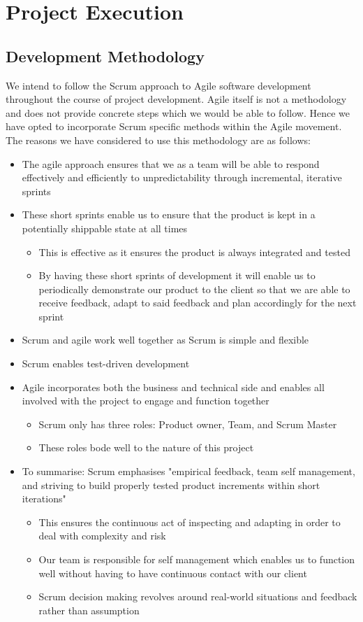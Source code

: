 \documentclass{article}
\begin{document}
\cleardoublepage
    
\section{Project Execution}
	\subsection{Development Methodology}
		We intend to follow the Scrum approach to Agile software development throughout the course of project development. Agile itself is not a methodology and does not provide concrete steps which we would be able to follow. Hence we have opted to incorporate Scrum specific methods within the Agile movement. The reasons we have considered to use this methodology are as follows:
		\begin{itemize}
			\item The agile approach ensures that we as a team will be able to respond effectively and efficiently to unpredictability through incremental, iterative sprints
			\item These short sprints enable us to ensure that the product is kept in a potentially shippable state at all times
			\begin{itemize}
				\item This is effective as it ensures the product is always integrated and tested
				\item By having these short sprints of development it will enable us to periodically demonstrate our product to the client so that we are able to receive feedback, adapt to said feedback and plan accordingly for the next sprint
			\end{itemize}
			\item Scrum and agile work well together as Scrum is simple and flexible
			\item Scrum enables test-driven development
			\item Agile incorporates both the business and technical side and enables all involved with the project to engage and function together
			\begin{itemize}
				\item Scrum only has three roles: Product owner, Team, and Scrum Master
				\item These roles bode well to the nature of this project
			\end{itemize}
			\item To summarise: Scrum emphasises "empirical feedback, team self management, and striving to build properly tested product increments within short iterations"
			\begin{itemize}
				\item This ensures the continuous act of inspecting and adapting in order to deal with complexity and risk
				\item Our team is responsible for self management which enables us to function well without having to have continuous contact with our client
				\item Scrum decision making revolves around real-world situations and feedback rather than assumption
			\end{itemize}
		\end{itemize}
\end{document}
